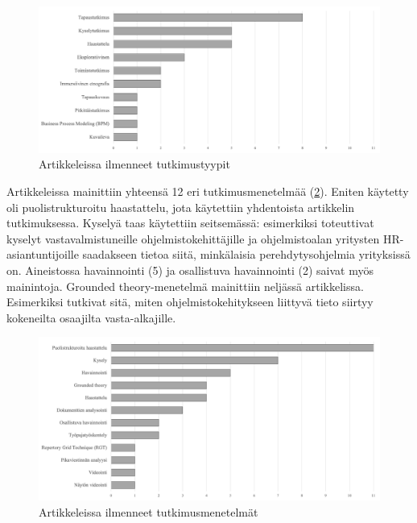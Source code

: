 \documentclass[utf8]{gradu3}
\begin{document}
\begin{figure}[h]
    \centering
    \includegraphics[width=\textwidth]{media/tutkimustyypit.png}
    \caption{Artikkeleissa ilmenneet tutkimustyypit}
    \label{kuvio:tutkimustyypit}
\end{figure}

Artikkeleissa mainittiin yhteensä 12 eri tutkimusmenetelmää (\ref{kuvio:tutkimusmenetelmat}). Eniten käytetty oli puolistrukturoitu haastattelu, jota käytettiin yhdentoista artikkelin tutkimuksessa. Kyselyä taas käytettiin seitsemässä: esimerkiksi \textcite{kulkarni-ym-2010} toteuttivat kyselyt vastavalmistuneille ohjelmistokehittäjille ja ohjelmistoalan yritysten HR-asiantuntijoille saadakseen tietoa siitä, minkälaisia perehdytysohjelmia yrityksissä on. Aineistossa havainnointi (5) ja osallistuva havainnointi (2) saivat myös mainintoja. Grounded theory-menetelmä mainittiin neljässä artikkelissa. Esimerkiksi \textcite{viana-ym-2014} tutkivat sitä, miten ohjelmistokehitykseen liittyvä tieto siirtyy kokeneilta osaajilta vasta-alkajille. 

\begin{figure}[h]
    \centering
    \includegraphics[width=\textwidth]{media/menetelmat.png}
    \caption{Artikkeleissa ilmenneet tutkimusmenetelmät}
    \label{kuvio:tutkimusmenetelmat}
\end{figure}
\end{document}
